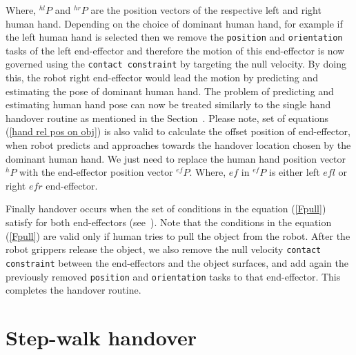 Where, ${}^{hl}{P}$ and ${}^{hr}{P}$ are the position vectors of the respective left and right human hand. Depending on the choice of dominant human hand, for example if the left human hand is selected then we remove the \texttt{position} and \texttt{orientation} tasks of the left end-effector and therefore the motion of this end-effector is now governed using the \texttt{contact constraint} by targeting the null velocity. By doing this, the robot right end-effector would lead the motion by predicting and estimating the pose of dominant human hand. The problem of predicting and estimating human hand pose can now be treated similarly to the single hand handover routine as mentioned in the Section~. Please note, set of equations (\ref{hand rel pos on obj}) is also valid to calculate the offset position of end-effector, when robot predicts and approaches towards the handover location chosen by the dominant human hand. We just need to replace the human hand position vector ${}^{h}{P}$ with the end-effector position vector ${}^{ef}{P}$. Where, $ef$ in ${}^{ef}{P}$ is either left $efl$ or right $efr$ end-effector.


Finally handover occurs when the set of conditions in the equation (\ref{Fpull}) satisfy for both end-effectors (see~). Note that the conditions in the equation (\ref{Fpull}) are valid only if human tries to pull the object from the robot. After the robot grippers release the object, we also remove the null velocity \texttt{contact constraint} between the end-effectors and the object surfaces, and add again the previously removed \texttt{position} and \texttt{orientation} tasks to that end-effector. This completes the handover routine. 




\clearpage

\section{Step-walk handover}

